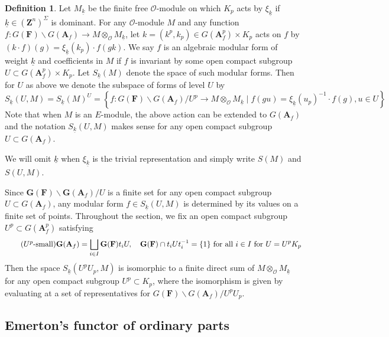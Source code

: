 \documentclass[leqno]{amsart}
\newcommand{\wt}[1]{\underline{ #1 }}
\newcommand{\GG}{\mathbf G}
\newcommand{\Z}{{\mathbf{Z}}}
\newcommand{\A}{\mathbf A}
\newcommand{\F}{{\mathbf{F}}} %
\newcommand{\oo}{\mathcal{O}} %
\theoremstyle{definition}
\newtheorem{defn}[thm]{Definition}
\theoremstyle{remark}
\begin{document}
\begin{defn}\label{def:algform}
Let $M_{\wt{k}}$ be the finite free $\oo$-module
on which $K_p$ acts by $\xi_{\wt{k}}$
if $\wt{k}\in (\Z^n)^{\Sigma}$ is dominant. 
For any $\oo$-module $M$ and any function
$f\colon G(\F)\backslash G(\A_f)\to M\otimes_{\oo}M_{\wt{k}}$,
let $k=(k^p,k_p)\in G(\A_f^p)\times K_p$ acts on $f$ by 
$(k\cdot f)(g)=\xi_{\wt{k}}(k_p)\cdot f(gk)$.
We say $f$ is an algebraic modular form of 
weight $\wt{k}$ and coefficients in $M$
if $f$ is invariant by some open compact subgroup
$U\subset G(\A_f^p)\times K_p$.
Let $S_{\wt{k}}(M)$
denote the space of such modular forms.
Then for $U$ as above we 
denote the subspace of forms
of level $U$ by
\begin{equation}
S_{\wt{k}}(U,M)=
S_{\wt{k}}(M)^U=
\left\{ f: G(\F)\backslash G(\A_f)/U^p 
\rightarrow M\otimes_{\oo}M_{\wt{k}}
\mid f(gu)=\xi_{\wt{k}}(u_p)^{-1}\cdot f(g), u\in U\right\} 
\end{equation}
Note that when $M$ is an  $E$-module,
the above action can be extended 
to  $G(\A_f)$
and the notation  $S_{\wt{k}}(U,M)$
makes sense for any open compact subgroup
$U\subset G(\A_f)$.

We will omit $\wt{k}$ 
when $\xi_{\wt{k}}$ is the trivial representation
and simply write
$S(M)$ and  $S(U,M)$.
\end{defn}


Since $\GG(\F)\backslash \GG(\A_f)/U$ is a finite set
for any open compact subgroup $U\subset G(\A_f)$,
any modular form $f\in S_{\wt{k}}(U,M)$ 
is determined by its values on a finite set of points.
Throughout the section,
we fix an open compact subgroup 
$U^p\subset G(\A_f^p)$ satisfying 
\begin{equation}\label{cond:small}\tag{$U^p$-\text{small}}
	\GG(\A_f)=\bigsqcup_{i\in I}
	\GG(\F)t_i U,\quad
	\GG(\F)\cap t_iUt_i^{-1}=\{1\} \text{ for all } i\in I
	\text{ for } U=U^pK_p
\end{equation}
Then the space $S_{\wt{k}}(U^pU_p,M)$ is
isomorphic to a finite direct sum of 
$M\otimes_{\oo}M_{\wt{k}}$
for any open compact subgroup $U^p\subset K_p$,
where the isomorphism
is given by 
evaluating at a set of representatives
for  $G(\F)\backslash G(\A_f)/U^pU_p$.

\subsection{Emerton's functor of ordinary parts}
\end{document}
